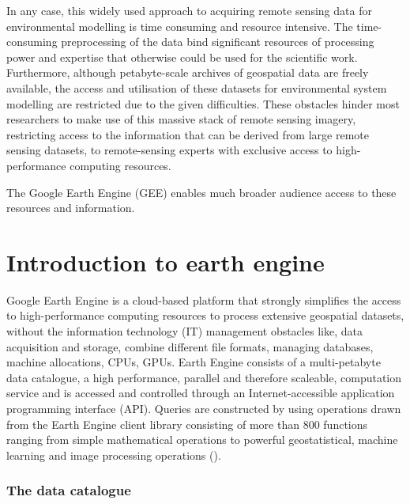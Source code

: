 In any case, this widely used approach to acquiring remote sensing data for environmental modelling is time consuming and resource intensive.
The time-consuming preprocessing of the data bind significant resources of processing power and expertise that otherwise could be used for the scientific work. Furthermore, although petabyte-scale archives of geospatial data are freely available, the access and utilisation of these datasets for environmental system modelling are restricted due to the given difficulties. 
These obstacles hinder most researchers to make use of this massive stack of remote sensing imagery, restricting access to the information that can be derived from large remote sensing datasets, to remote-sensing experts with exclusive access to high-performance computing resources.

The Google Earth Engine (GEE) enables much broader audience access to these resources and information.

\section{Introduction to earth engine}

Google Earth Engine is a cloud-based platform that strongly simplifies the access to high-performance computing resources to process extensive geospatial datasets, without the information technology (IT) management obstacles like, data acquisition and storage, combine different file formats, managing databases, machine allocations, CPUs, GPUs. 
Earth Engine consists of a multi-petabyte data catalogue, a high performance, parallel and therefore scaleable, computation service and is accessed and controlled through an Internet-accessible application programming interface (API).  Queries are constructed by using operations drawn from the Earth Engine client library consisting of more than 800 functions ranging from simple mathematical operations to powerful geostatistical, machine learning and image processing operations (\cite{gorelick2017google}).

\subsubsection{The data catalogue}


